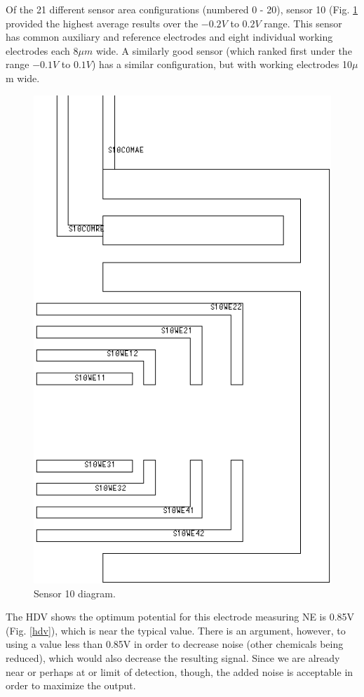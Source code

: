 \documentclass{article}
\begin{document}
Of the 21 different sensor area configurations (numbered 0 - 20), sensor 10 (Fig. \ref{sensor-10} provided the highest average results over the $-0.2V$ to $0.2V$ range. This sensor has common auxiliary and reference electrodes and eight individual working electrodes each $8\mu m$ wide. A similarly good sensor (which ranked first under the range $-0.1V$ to $0.1V$) has a similar configuration, but with working electrodes 10$\mu$m wide.

\begin{figure}
\centering
\includegraphics[height=\linewidth]{figures/s10.png}
\caption{Sensor 10 diagram.}
\label{sensor-10}
\end{figure}

The HDV shows the optimum potential for this electrode measuring NE is 0.85V (Fig. \ref{hdv}), which is near the typical value. There is an argument, however, to using a value less than 0.85V in order to decrease noise (other chemicals being reduced), which would also decrease the resulting signal. Since we are already near or perhaps at or limit of detection, though, the added noise is acceptable in order to maximize the output.
\end{document}

